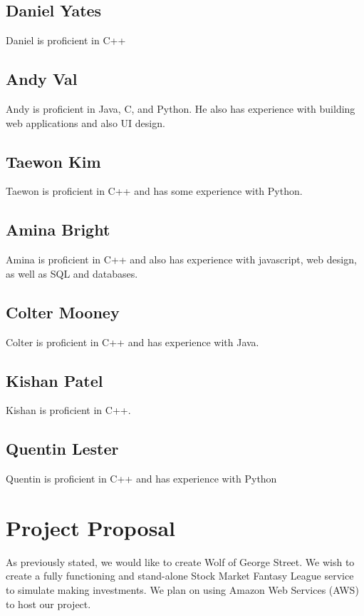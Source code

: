 \documentclass[11pt,letterpaper,oneside]{memoir}
\begin{document}
\section{Daniel Yates}
Daniel is proficient in C++

\section{Andy Val}
Andy is proficient in Java, C, and Python. He also has experience with building web applications and also UI design. 

\section{Taewon Kim}
Taewon is proficient in C++ and has some experience with Python. 

\section{Amina Bright}
Amina is proficient in C++ and also has experience with javascript, web design, as well as SQL and databases. 

\section{Colter Mooney}
Colter is proficient in C++ and has experience with Java.

\section{Kishan Patel}
Kishan is proficient in C++.

\section{Quentin Lester}
Quentin is proficient in C++ and has experience with Python


\chapter{Project Proposal}
\label{proposal}
As previously stated, we would like to create Wolf of George Street. We wish to create a fully functioning and stand-alone Stock Market Fantasy League service to simulate making investments. We plan on using Amazon Web Services (AWS) to host our project.
\end{document}
